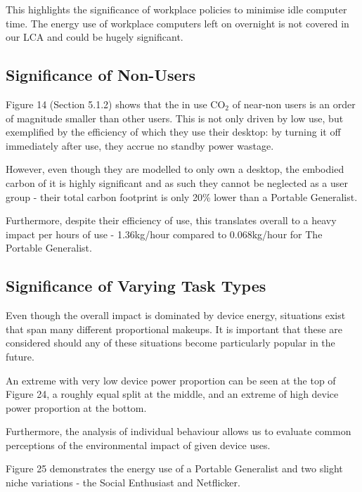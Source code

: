 \documentclass[conference]{IEEEtran}
\begin{document}
This highlights the significance of workplace policies to minimise
idle computer time. The energy use of workplace computers left on
overnight is not covered in our LCA and could be hugely significant.

\subsection{Significance of Non-Users}

Figure 14 (Section 5.1.2) shows that the in use CO$_2$ of near-non users
is an order of magnitude smaller than other users. This is not only
driven by low use, but exemplified by the efficiency of which they use
their desktop: by turning it off immediately after use, they accrue no
standby power wastage.

However, even though they are modelled to only own a desktop, the
embodied carbon of it is highly significant and as such they cannot be
neglected as a user group - their total carbon footprint is only 20\%
lower than a Portable Generalist.

Furthermore, despite their efficiency of use, this translates overall
to a heavy impact per hours of use - 1.36kg/hour compared to
0.068kg/hour for The Portable Generalist.

\subsection{Significance of Varying Task Types}

Even though the overall impact is dominated by device energy,
situations exist that span many different proportional makeups. It is
important that these are considered should any of these situations
become particularly popular in the future.

An extreme with very low device power proportion can be seen at the
top of Figure 24, a roughly equal split at the middle, and an extreme
of high device power proportion at the bottom.

Furthermore, the analysis of individual behaviour allows us to
evaluate common perceptions of the environmental impact of given
device uses.

Figure 25 demonstrates the energy use of a Portable Generalist and two
slight niche variations - the Social Enthusiast and Netflicker.
\end{document}
